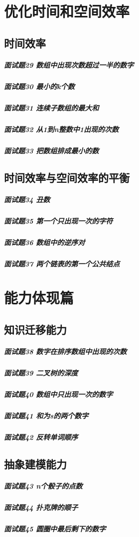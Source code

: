 \documentclass[UTF8,a4paper,12pt]{ctexbook}
\begin{document}
	\section{优化时间和空间效率}
		\subsection{时间效率}
			\subparagraph{面试题29 数组中出现次数超过一半的数字}
			
			\subparagraph{面试题30 最小的k个数}
			
			\subparagraph{面试题31 连续子数组的最大和}
			
			\subparagraph{面试题32 从1到n整数中1出现的次数}
			
			\subparagraph{面试题33 把数组排成最小的数}
			
		\subsection{时间效率与空间效率的平衡}
			\subparagraph{面试题34 丑数}
			
			\subparagraph{面试题35 第一个只出现一次的字符}
			
			\subparagraph{面试题36 数组中的逆序对}
			
			\subparagraph{面试题37 两个链表的第一个公共结点}
	
	\section{能力体现篇}
		\subsection{知识迁移能力}
			\subparagraph{面试题38 数字在排序数组中出现的次数}
			
			\subparagraph{面试题39 二叉树的深度}
			
			\subparagraph{面试题40 数组中只出现一次的数字}
			
			\subparagraph{面试题41 和为s的两个数字}
			
			\subparagraph{面试题42 反转单词顺序}
			
		\subsection{抽象建模能力}
			\subparagraph{面试题43 n个骰子的点数}
			
			\subparagraph{面试题44 扑克牌的顺子}
			
			\subparagraph{面试题45 圆圈中最后剩下的数字}
		
\end{document}
